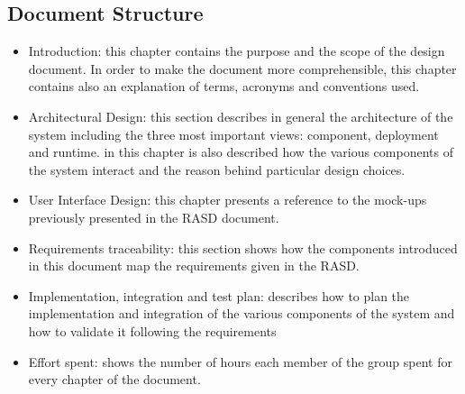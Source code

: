 \subsection{Document Structure}
\begin{itemize}
	\item Introduction: this chapter contains the purpose and the scope of the design document. In order to make the document more comprehensible, this chapter contains also an explanation of terms, acronyms and conventions used.
	\item Architectural Design: this section describes in general the architecture of the system including the three most important views: component, deployment and runtime. in this chapter is also described how the various components of the system interact and the reason behind particular design choices.
	\item User Interface Design: this chapter presents a reference to the mock-ups previously presented in the RASD document.
	\item Requirements traceability: this section shows how the components introduced in this document map the requirements given in the RASD.
	\item Implementation, integration and test plan: describes how to plan the implementation and integration of the various components of the system and how to validate it following the requirements
	\item Effort spent: shows the number of hours each member of the group spent for every chapter of the document.
\end{itemize}